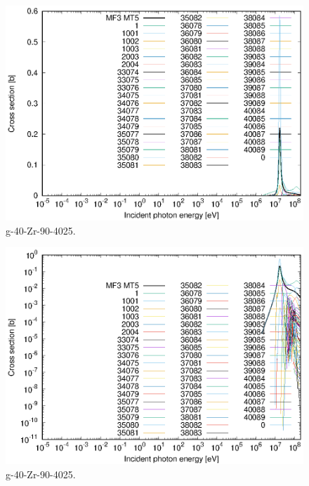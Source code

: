\begin{figure}
 \includegraphics[width=\linewidth]{eps/g_40-Zr-90_4025.eps}
  \caption{g-40-Zr-90-4025.}
\end{figure}
\begin{figure}
 \includegraphics[width=\linewidth]{eps-log/g_40-Zr-90_4025.eps}
 \caption{g-40-Zr-90-4025.}
\end{figure}
\newpage \clearpage


